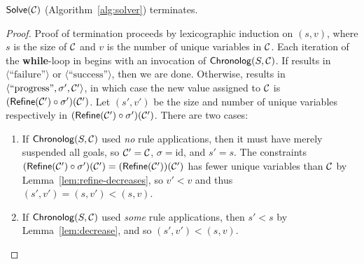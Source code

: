 \documentclass[runningheads]{llncs}
\begin{document}

\begin{lemma}
  \label{lem:solver-termination}
  $\textsf{Solve}(\mathcal{C})$ (Algorithm~\ref{alg:solver}) terminates.
\end{lemma}
\begin{proof}
  Proof of termination proceeds by lexicographic induction on $(s, v)$, where $s$ is the size of $\mathcal{C}$ and $v$ is the number of unique variables in $\mathcal{C}$.
  Each iteration of the \textbf{while}-loop in  begins with an invocation of $\textsf{Chronolog}(S, \mathcal{C})$.
  If  results in $\langle \text{``failure''} \rangle$ or $\langle \text{``success''} \rangle$, then we are done.
  Otherwise,  results in $\langle \text{``progress''}, \sigma', \mathcal{C}' \rangle$, in which case the new value assigned to $\mathcal{C}$ is $(\textsf{Refine}(\mathcal{C}') \circ \sigma') (\mathcal{C}')$.
  Let $(s', v')$ be the size and number of unique variables respectively in $(\textsf{Refine}(\mathcal{C}') \circ \sigma') (\mathcal{C}')$.
  There are two cases:
  \begin{enumerate}
  \item
    If $\textsf{Chronolog}(S, \mathcal{C})$ used \textit{no} rule applications, then it must have merely suspended all goals, so $\mathcal{C}' = \mathcal{C}$, $\sigma = \text{id}$, and $s' = s$.
    The constraints $(\textsf{Refine}(\mathcal{C}') \circ \sigma') (\mathcal{C}') = (\textsf{Refine}(\mathcal{C}')) (\mathcal{C}')$ has fewer unique variables than $\mathcal{C}$ by Lemma~\ref{lem:refine-decreases}, so $v' < v$ and thus $(s', v') = (s, v') < (s, v)$.
  \item
    If $\textsf{Chronolog}(S, \mathcal{C})$ used \textit{some} rule applications, then $s' < s$ by Lemma~\ref{lem:decrease}, and so $(s', v') < (s, v)$.
  \end{enumerate}
\end{proof}
\end{document}
